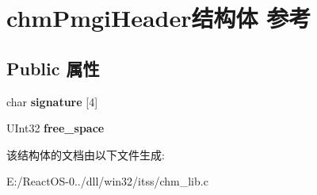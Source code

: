 \hypertarget{structchm_pmgi_header}{}\section{chm\+Pmgi\+Header结构体 参考}
\label{structchm_pmgi_header}
\subsection*{Public 属性}
\begin{DoxyCompactItemize}
\item 
\mbox{\label{structchm_pmgi_header_a7626042816bdb5c4da107421c67d292f}} 
char {\bfseries signature} \mbox{[}4\mbox{]}
\item 
\mbox{\label{structchm_pmgi_header_acdba172744ec5a104893052ebb01f301}} 
U\+Int32 {\bfseries free\+\_\+space}
\end{DoxyCompactItemize}


该结构体的文档由以下文件生成\+:\begin{DoxyCompactItemize}
\item 
E\+:/\+React\+O\+S-\/0../dll/win32/itss/chm\+\_\+lib.\+c\end{DoxyCompactItemize}
